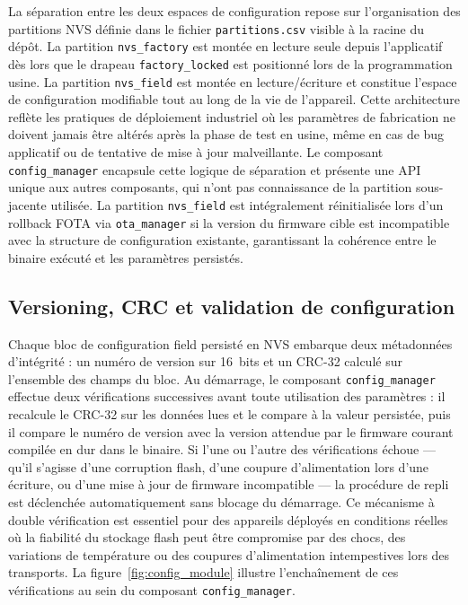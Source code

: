 La séparation entre les deux espaces de configuration repose sur
l'organisation des partitions NVS définie dans le fichier
\texttt{partitions.csv} visible à la racine du dépôt. La partition
\texttt{nvs\_factory} est montée en lecture seule depuis l'applicatif
dès lors que le drapeau \texttt{factory\_locked} est positionné lors
de la programmation usine. La partition \texttt{nvs\_field} est montée
en lecture/écriture et constitue l'espace de configuration modifiable
tout au long de la vie de l'appareil. Cette architecture reflète les
pratiques de déploiement industriel où les paramètres de fabrication
ne doivent jamais être altérés après la phase de test en usine, même
en cas de bug applicatif ou de tentative de mise à jour malveillante.
Le composant \texttt{config\_manager} encapsule cette logique de
séparation et présente une API unique aux autres composants, qui
n'ont pas connaissance de la partition sous-jacente utilisée.
La partition \texttt{nvs\_field} est intégralement réinitialisée
lors d'un rollback FOTA via \texttt{ota\_manager} si la version du
firmware cible est incompatible avec la structure de configuration
existante, garantissant la cohérence entre le binaire exécuté et
les paramètres persistés.

\subsection{Versioning, CRC et validation de configuration}
\label{subsec:versioning}

Chaque bloc de configuration field persisté en NVS embarque deux
métadonnées d'intégrité : un numéro de version sur 16~bits et un
CRC-32 calculé sur l'ensemble des champs du bloc. Au démarrage, le
composant \texttt{config\_manager} effectue deux vérifications
successives avant toute utilisation des paramètres : il recalcule
le CRC-32 sur les données lues et le compare à la valeur persistée,
puis il compare le numéro de version avec la version attendue par le
firmware courant compilée en dur dans le binaire. Si l'une ou l'autre
des vérifications échoue — qu'il s'agisse d'une corruption flash,
d'une coupure d'alimentation lors d'une écriture, ou d'une mise à
jour de firmware incompatible — la procédure de repli est déclenchée
automatiquement sans blocage du démarrage. Ce mécanisme à double
vérification est essentiel pour des appareils déployés en conditions
réelles où la fiabilité du stockage flash peut être compromise par
des chocs, des variations de température ou des coupures d'alimentation
intempestives lors des transports. La figure~\ref{fig:config_module}
illustre l'enchaînement de ces vérifications au sein du composant
\texttt{config\_manager}.

